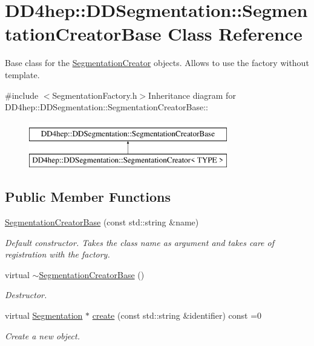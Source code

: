\hypertarget{class_d_d4hep_1_1_d_d_segmentation_1_1_segmentation_creator_base}{
\section{DD4hep::DDSegmentation::SegmentationCreatorBase Class Reference}
\label{class_d_d4hep_1_1_d_d_segmentation_1_1_segmentation_creator_base}
}


Base class for the \hyperlink{class_d_d4hep_1_1_d_d_segmentation_1_1_segmentation_creator}{SegmentationCreator} objects. Allows to use the factory without template.  


{\ttfamily \#include $<$SegmentationFactory.h$>$}Inheritance diagram for DD4hep::DDSegmentation::SegmentationCreatorBase::\begin{figure}[H]
\begin{center}
\leavevmode
\includegraphics[height=2cm]{class_d_d4hep_1_1_d_d_segmentation_1_1_segmentation_creator_base}
\end{center}
\end{figure}
\subsection*{Public Member Functions}
\begin{DoxyCompactItemize}
\item 
\hyperlink{class_d_d4hep_1_1_d_d_segmentation_1_1_segmentation_creator_base_aaea0ce7f18f4a00718586fde3b214aaa}{SegmentationCreatorBase} (const std::string \&name)
\begin{DoxyCompactList}\small\item\em Default constructor. Takes the class name as argument and takes care of registration with the factory. \item\end{DoxyCompactList}\item 
virtual \hyperlink{class_d_d4hep_1_1_d_d_segmentation_1_1_segmentation_creator_base_aa389c741b4df8a82ff944fed42b3dbf7}{$\sim$SegmentationCreatorBase} ()
\begin{DoxyCompactList}\small\item\em Destructor. \item\end{DoxyCompactList}\item 
virtual \hyperlink{class_d_d4hep_1_1_d_d_segmentation_1_1_segmentation}{Segmentation} $\ast$ \hyperlink{class_d_d4hep_1_1_d_d_segmentation_1_1_segmentation_creator_base_aad60d04fe90588d97eeb8030f8d6daa3}{create} (const std::string \&identifier) const =0
\begin{DoxyCompactList}\small\item\em Create a new object. \item\end{DoxyCompactList}\end{DoxyCompactItemize}


